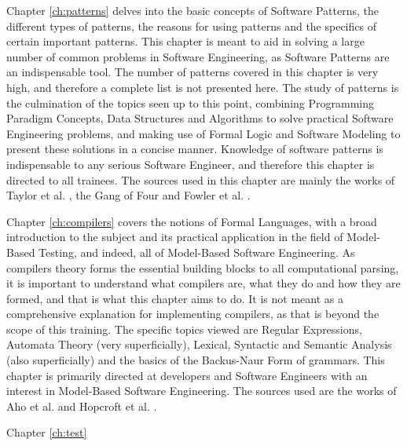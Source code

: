 Chapter \ref{ch:patterns} delves into the basic concepts of Software Patterns, the different types of patterns, the reasons for using patterns and the specifics of certain important patterns. This chapter is meant to aid in solving a large number of common problems in Software Engineering, as Software Patterns are an indispensable tool. The number of patterns covered in this chapter is very high, and therefore a complete list is not presented here. The study of patterns is the culmination of the topics seen up to this point, combining Programming Paradigm Concepts, Data Structures and Algorithms to solve practical Software Engineering problems, and making use of Formal Logic and Software Modeling to present these solutions in a concise manner. Knowledge of software patterns is indispensable to any serious Software Engineer, and therefore this chapter is directed to all trainees. The sources used in this chapter are mainly the works of Taylor et al. \cite{TAYLOR:2009}, the Gang of Four \cite{GAMMA:1995} and Fowler et al. \cite{FOWLER:2002}.

Chapter \ref{ch:compilers} covers the notions of Formal Languages, with a broad introduction to the subject and its practical application in the field of Model-Based Testing, and indeed, all of Model-Based Software Engineering. As compilers theory forms the essential building blocks to all computational parsing, it is important to understand what compilers are, what they do and how they are formed, and that is what this chapter aims to do. It is not meant as a comprehensive explanation for implementing compilers, as that is beyond the scope of this training. The specific topics viewed are Regular Expressions, Automata Theory (very superficially), Lexical, Syntactic and Semantic Analysis (also superficially) and the basics of the Backus-Naur Form of grammars. This chapter is primarily directed at developers and Software Engineers with an interest in Model-Based Software Engineering. The sources used are the works of Aho et al. \cite{AHO:2006} and Hopcroft et al. \cite{HOPCROFT:2000}.

Chapter \ref{ch:test}
